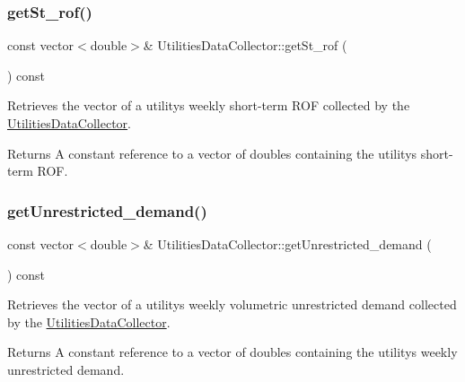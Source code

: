 \subsubsection{\texorpdfstring{get\+St\+\_\+rof()}{getSt\_rof()}}
{\footnotesize\ttfamily const vector$<$double$>$\& Utilities\+Data\+Collector\+::get\+St\+\_\+rof (\begin{DoxyParamCaption}{ }\end{DoxyParamCaption}) const}



Retrieves the vector of a utility\textquotesingle{}s weekly short-\/term R\+OF collected by the {\ttfamily \mbox{\hyperlink{classUtilitiesDataCollector}{Utilities\+Data\+Collector}}}. 

\begin{DoxyReturn}{Returns}
A constant reference to a vector of doubles containing the utility\textquotesingle{}s short-\/term R\+OF. 
\end{DoxyReturn}
\mbox{\label{classUtilitiesDataCollector_a11319f69ba0cf1c932502e8c35d7f741}} 
\subsubsection{\texorpdfstring{get\+Unrestricted\+\_\+demand()}{getUnrestricted\_demand()}}
{\footnotesize\ttfamily const vector$<$double$>$\& Utilities\+Data\+Collector\+::get\+Unrestricted\+\_\+demand (\begin{DoxyParamCaption}{ }\end{DoxyParamCaption}) const}



Retrieves the vector of a utility\textquotesingle{}s weekly volumetric unrestricted demand collected by the {\ttfamily \mbox{\hyperlink{classUtilitiesDataCollector}{Utilities\+Data\+Collector}}}. 

\begin{DoxyReturn}{Returns}
A constant reference to a vector of doubles containing the utility\textquotesingle{}s weekly unrestricted demand. 
\end{DoxyReturn}
\mbox{\label{classUtilitiesDataCollector_a805182c7f423290135a5c92844cdbb4a}} 
